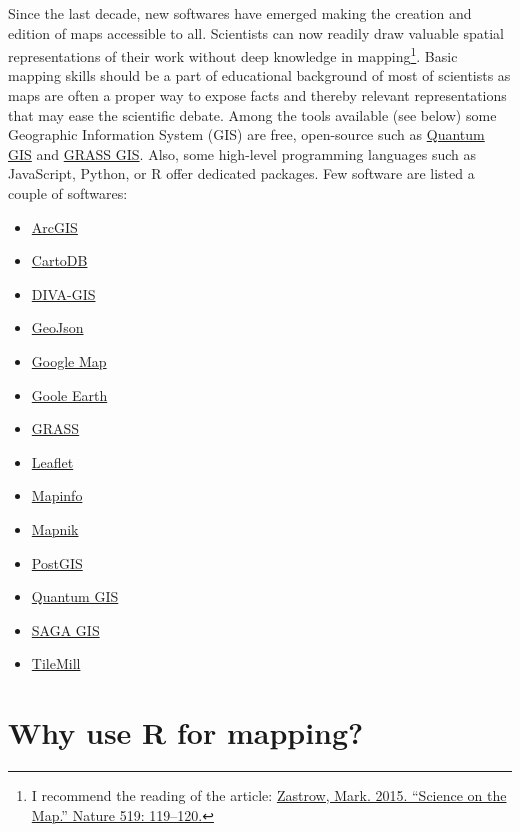 \documentclass[]{report}
\providecommand{\tightlist}{%
  \setlength{\itemsep}{0pt}\setlength{\parskip}{0pt}}
\let\rmarkdownfootnote\footnote%
\def\footnote{\protect\rmarkdownfootnote}
\begin{document}
Since the last decade, new softwares have emerged making the creation
and edition of maps accessible to all. Scientists can now readily draw
valuable spatial representations of their work without deep knowledge in
mapping\footnote{I recommend the reading of the article:
  \href{http://www.nature.com/news/data-visualization-science-on-the-map-1.17024}{Zastrow,
  Mark. 2015. ``Science on the Map.'' Nature 519: 119--120.}}. Basic
mapping skills should be a part of educational background of most of
scientists as maps are often a proper way to expose facts and thereby
relevant representations that may ease the scientific debate. Among the
tools available (see below) some Geographic Information System (GIS) are
free, open-source such as \href{http://qgis.org/en/site/}{Quantum GIS}
and \href{http://grass.osgeo.org}{GRASS GIS}. Also, some high-level
programming languages such as JavaScript, Python, or R offer dedicated
packages. Few software are listed a couple of softwares:

\begin{itemize}
\tightlist
\item
  \href{http://www.arcgis.com/features/}{ArcGIS}
\item
  \href{http://cartodb.com}{CartoDB}
\item
  \href{http://www.diva-gis.org}{DIVA-GIS}
\item
  \href{http://geojson.io/\#map=2/20.0/0.0}{GeoJson}
\item
  \href{https://www.google.fr/maps}{Google Map}
\item
  \href{http://www.google.fr/intl/eng/earth/index.html}{Goole Earth}
\item
  \href{http://grass.osgeo.org}{GRASS}
\item
  \href{http://leafletjs.com}{Leaflet}
\item
  \href{http://www.mapinfo.com}{Mapinfo}
\item
  \href{http://mapnik.org}{Mapnik}
\item
  \href{http://www.postgis.org}{PostGIS}
\item
  \href{http://qgis.org/en/site/}{Quantum GIS}
\item
  \href{http://www.saga-gis.org/en/index.html}{SAGA GIS}
\item
  \href{https://www.mapbox.com/tilemill/}{TileMill}
\end{itemize}

\section{Why use R for mapping?}\label{why-use-r-for-mapping}
\end{document}
